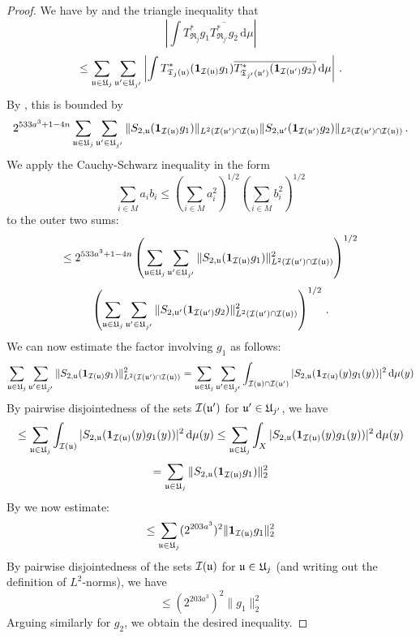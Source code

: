 \begin{proof}
    \leanok
    We have by  and the triangle inequality that
    $$
        \left| \int T_{\mathfrak{R}_j}^*g_1 \overline{T_{\mathfrak{R}_{j'}}^*g_2} \, \mathrm{d}\mu \right|
    $$
    $$
        \le \sum_{{\mathfrak u} \in {\mathfrak U}_j} \sum_{{\mathfrak u}' \in {\mathfrak U}_{j'}} \left| \int T^*_{{\mathfrak T}_j({\mathfrak u})} (\mathbf{1}_{{\mathcal{I}}({\mathfrak u})} g_1) \overline{T^*_{{\mathfrak T}_{j'}({\mathfrak u}')} (\mathbf{1}_{{\mathcal{I}}({\mathfrak u}')} g_2)} \, \mathrm{d}\mu \right|\,.
    $$
    By , this is bounded by
    \begin{equation}
        \label{eq-S2uu'}
         2^{533a^3+1-4n} \sum_{{\mathfrak u} \in {\mathfrak U}_j} \sum_{{\mathfrak u}' \in {\mathfrak U}_{j'}} \|S_{2,{\mathfrak u}} (\mathbf{1}_{{\mathcal{I}}({\mathfrak u})}g_1)\|_{L^2({\mathcal{I}}({\mathfrak u}')\cap {\mathcal{I}}({\mathfrak u})} \|S_{2, {\mathfrak u}'} (\mathbf{1}_{{\mathcal{I}}({\mathfrak u}')}g_2)\|_{L^2({\mathcal{I}}({\mathfrak u}')\cap{\mathcal{I}}({\mathfrak u}))}\,.
    \end{equation}
    We apply the Cauchy-Schwarz inequality in the form
    \begin{equation*}
        \sum_{i \in M} a_i b_i \le (\sum_{i \in M} a_i^2 )^{1/2}(\sum_{i \in M} b_i^2 )^{1/2}
    \end{equation*} to the outer two sums:
    $$
        \le 2^{533a^3+1-4n} \left(\sum_{{\mathfrak u} \in {\mathfrak U}_j} \sum_{{\mathfrak u}' \in {\mathfrak U}_{j'}} \|S_{2,{\mathfrak u}} (\mathbf{1}_{{\mathcal{I}}({\mathfrak u})}g_1)\|_{L^2({\mathcal{I}}({\mathfrak u}')\cap {\mathcal{I}}({\mathfrak u}))}^2 \right)^{1/2}
    $$
    $$
        \left(\sum_{{\mathfrak u} \in {\mathfrak U}_j} \sum_{{\mathfrak u}' \in {\mathfrak U}_{j'}} \|S_{2,{\mathfrak u}'} (\mathbf{1}_{{\mathcal{I}}({\mathfrak u}')}g_2)\|_{L^2({\mathcal{I}}({\mathfrak u}')\cap{\mathcal{I}}({\mathfrak u}))}^2 \right)^{1/2}\,.
    $$
    We can now estimate the factor involving $g_1$ as follows:
    $$
        \sum_{{\mathfrak u} \in {\mathfrak U}_j}\sum_{{\mathfrak u}' \in {\mathfrak U}_{j'}} \|S_{2,{\mathfrak u}} (\mathbf{1}_{{\mathcal{I}}({\mathfrak u})}g_1)\|_{L^2({\mathcal{I}}({\mathfrak u}')\cap {\mathcal{I}}({\mathfrak u}))}^2
        = \sum_{{\mathfrak u} \in {\mathfrak U}_j}\sum_{{\mathfrak u}' \in {\mathfrak U}_{j'}} \int_{{\mathcal{I}}({\mathfrak u}) \cap {\mathcal{I}}({\mathfrak u}')} |S_{2,{\mathfrak u}} (\mathbf{1}_{{\mathcal{I}}({\mathfrak u})}(y)g_1(y))|^2 \, \mathrm{d}\mu(y)
    $$
    By pairwise disjointedness of the sets ${\mathcal{I}}({\mathfrak u}')$ for ${\mathfrak u}' \in {\mathfrak U}_{j'}$, we have
    $$
        \le \sum_{{\mathfrak u} \in {\mathfrak U}_j}\int_{{\mathcal{I}}({\mathfrak u})} |S_{2,{\mathfrak u}} (\mathbf{1}_{{\mathcal{I}}({\mathfrak u})}(y)g_1(y))|^2 \, \mathrm{d}\mu(y)
        \le \sum_{{\mathfrak u} \in {\mathfrak U}_j}\int_{X} |S_{2,{\mathfrak u}} (\mathbf{1}_{{\mathcal{I}}({\mathfrak u})}(y)g_1(y))|^2 \, \mathrm{d}\mu(y)
    $$
    $$
       = \sum_{{\mathfrak u} \in {\mathfrak U}_j}\|S_{2,{\mathfrak u}} (\mathbf{1}_{{\mathcal{I}}({\mathfrak u})}g_1)\|_2^2
    $$
    By  we now estimate:
    $$
        \le \sum_{{\mathfrak u} \in {\mathfrak U}_j}(2^{203a^3})^2 \|\mathbf{1}_{{\mathcal{I}}({\mathfrak u})}g_1\|_2^2
    $$
    By pairwise disjointedness of the sets ${\mathcal{I}}({\mathfrak u})$ for ${\mathfrak u} \in {\mathfrak U}_j$ (and writing out the definition of $L^2$-norms), we have
    $$
        \le (2^{203a^3})^2 \|g_1\|_2^2
    $$
    Arguing similarly for $g_2$, we obtain the desired inequality.
\end{proof}

